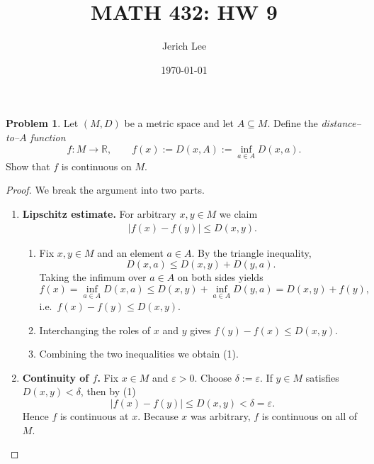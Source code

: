 \documentclass[12pt]{article}
\title{MATH 432: HW 9}
\author{Jerich Lee}
\date{\today}
\theoremstyle{definition} %
\newtheorem{problem}{Problem}
\theoremstyle{plain} %
\begin{document}
\maketitle
\begin{problem}
  Let $(M,D)$ be a metric space and let $A\subseteq M$.  
  Define the \emph{distance–to–$A$ function}
  \[
      f:M\longrightarrow\mathbb R,\qquad 
      f(x):=D(x,A):=\inf_{a\in A}D(x,a).
  \]
  Show that $f$ is continuous on $M$.
\end{problem}

\begin{proof}
  We break the argument into two parts.

  \begin{enumerate}
      \item \textbf{Lipschitz estimate.}  
            For arbitrary $x,y\in M$ we claim
            \begin{align}
                |f(x)-f(y)|\le D(x,y). \tag{1}
            \end{align}

            \begin{enumerate}
                \item Fix $x,y\in M$ and an element $a\in A$.  
                      By the triangle inequality,
                      \[
                          D(x,a)\le D(x,y)+D(y,a).
                      \]
                      Taking the infimum over $a\in A$ on both sides yields
                      \[
                          f(x)=\inf_{a\in A}D(x,a)\le D(x,y)+\inf_{a\in A}D(y,a)=D(x,y)+f(y),
                      \]
                      i.e.\ $f(x)-f(y)\le D(x,y)$.
                \item Interchanging the roles of $x$ and $y$ gives
                      $f(y)-f(x)\le D(x,y)$.
                \item Combining the two inequalities we obtain (1).
            \end{enumerate}

      \item \textbf{Continuity of $f$.}  
            Fix $x\in M$ and $\varepsilon>0$.  
            Choose $\delta:=\varepsilon$.  
            If $y\in M$ satisfies $D(x,y)<\delta$, then by (1)
            \[
                |f(x)-f(y)|\le D(x,y)<\delta=\varepsilon.
            \]
            Hence $f$ is continuous at $x$.  
            Because $x$ was arbitrary, $f$ is continuous on all of $M$.
  \end{enumerate}
\end{proof}
\end{document}
